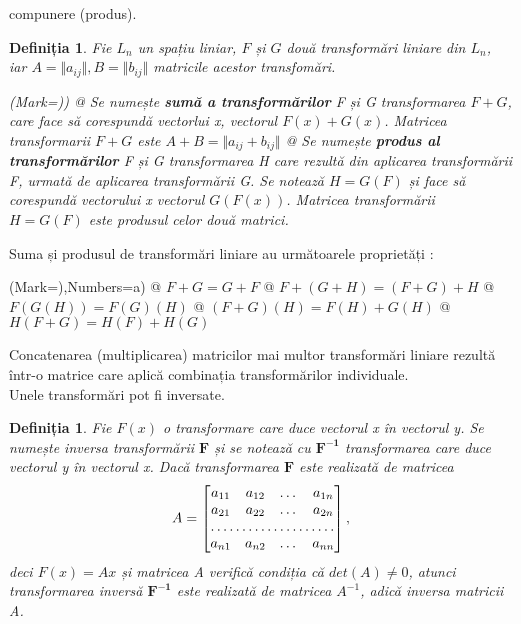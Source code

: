 compunere (produs).
\newtheorem{th_lin_tr_operations}[theorem_liniar_space]{Definiția}
\begin{th_lin_tr_operations}
Fie $\mathit{L_{n}}$ un spațiu liniar, $\mathit{F}$ și $\mathit{G}$ două
transformări liniare din $\mathit{L_{n}}$, iar $A = \Vert a_{ij} \Vert, B =
\Vert b_{ij} \Vert$ matricile acestor transfomări.
\begin{easylist}
\NewList(Mark={)})
@ Se numește \textbf{sumă a transformărilor} F și G transformarea $F + G$, care
face să corespundă vectorlui x, vectorul $F(x) + G(x)$. Matricea transformarii $F + G$
este $A + B = \Vert a_{ij} + b_{ij} \Vert$ 
@ Se numește \textbf{produs al transformărilor} F și G transformarea H care
rezultă din aplicarea transformării F, urmată de aplicarea transformării G. Se
notează $H = G(F)$ și face să corespundă vectorului x vectorul $G(F(x))$.
Matricea transformării $H = G(F)$ este produsul celor două matrici.
\end{easylist}
\end{th_lin_tr_operations}
Suma și produsul de transformări liniare au următoarele proprietăți :
\begin{easylist}
\NewList(Mark={)},Numbers=a)
@ $F + G = G + F$
@ $F + (G + H) = (F + G) + H$
@ $F(G(H)) = F(G)(H)$
@ $(F + G)(H) = F(H) + G(H)$
@ $H(F + G) = H(F) + H(G)$
\end{easylist}
Concatenarea (multiplicarea) matricilor mai multor transformări liniare rezultă
într-o matrice care aplică combinația transformărilor individuale.
\noindent
\\
Unele transformări pot fi inversate.

\newtheorem{th_tr_inverse}[theorem_liniar_space]{Definiția}
\begin{th_tr_inverse}
Fie $F(x)$ o transformare care duce vectorul \textit{x} în vectorul \textit{y}.
Se numește inversa transformării $\mathbf{F}$ și se notează cu $\mathbf{F^{-1}}$
transformarea care duce vectorul \textit{y} în vectorul \textit{x}.
Dacă transformarea $\mathbf{F}$ este realizată de matricea
\[
A = 
\begin{bmatrix}
a_{11} & a_{12} & \dots & a_{1n} \\
a_{21} & a_{22} & \dots & a_{2n} \\
\hdotsfor{4} \\
a_{n1} & a_{n2} & \dots & a_{nn}
\end{bmatrix},
\] deci $F(x) = Ax$ și matricea A verifică condiția că $det(A) \neq 0$, atunci
transformarea inversă $\mathbf{F^{-1}}$ este realizată de matricea $A^{-1}$,
adică inversa matricii A.
\end{th_tr_inverse}
